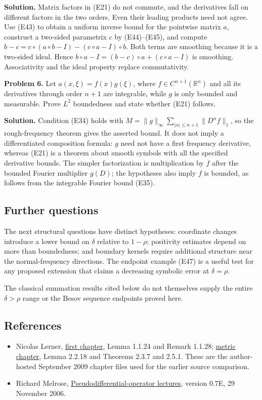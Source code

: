 \documentclass[
  11pt,
]{article}
\providecommand{\tightlist}{%
  \setlength{\itemsep}{0pt}\setlength{\parskip}{0pt}}
\begin{document}
\textbf{Solution.} Matrix factors in (E21) do not commute, and the
derivatives fall on different factors in the two orders. Even their
leading products need not agree. Use (E43) to obtain a uniform inverse
bound for the pointwise matrix \(a\), construct a two-sided parametrix
\(c\) by (E44)--(E45), and compute
\(b-c=c\circ(a\circ b-I)-(c\circ a-I)\circ b\). Both terms are smoothing
because it is a two-sided ideal. Hence
\(b\circ a-I=(b-c)\circ a+(c\circ a-I)\) is smoothing. Associativity and
the ideal property replace commutativity.

\textbf{Problem 6.} Let \(a(x,\xi)=f(x)g(\xi)\), where
\(f\in C^{n+1}(\mathbb R^n)\) and all its derivatives through order
\(n+1\) are integrable, while \(g\) is only bounded and measurable.
Prove \(L^2\) boundedness and state whether (E21) follows.

\textbf{Solution.} Condition (E34) holds with
\(M=\|g\|_\infty\sum_{|\alpha|\leq n+1}\|D^\alpha f\|_1\), so the
rough-frequency theorem gives the asserted bound. It does not imply a
differentiated composition formula: \(g\) need not have a first
frequency derivative, whereas (E21) is a theorem about smooth symbols
with all the specified derivative bounds. The simpler factorization is
multiplication by \(f\) after the bounded Fourier multiplier \(g(D)\);
the hypotheses also imply \(f\) is bounded, as follows from the
integrable Fourier bound (E35).

\subsection{Further questions}\label{further-questions}

The next structural questions have distinct hypotheses: coordinate
changes introduce a lower bound on \(\delta\) relative to \(1-\rho\);
positivity estimates depend on more than boundedness; and boundary
kernels require additional structure near the normal-frequency
directions. The endpoint example (E47) is a useful test for any proposed
extension that claims a decreasing symbolic error at \(\delta=\rho\).

The classical summation results cited below do not themselves supply the
entire \(\delta>\rho\) range or the Besov sequence endpoints proved
here.

\subsection{References}\label{references}

\begin{itemize}
\tightlist
\item
  Nicolas Lerner,
  \href{https://webusers.imj-prg.fr/~nicolas.lerner/ch1booklerner.pdf}{first
  chapter}, Lemma 1.1.24 and Remark 1.1.28;
  \href{https://webusers.imj-prg.fr/~nicolas.lerner/ch2booklerner.pdf}{metric
  chapter}, Lemma 2.2.18 and Theorems 2.3.7 and 2.5.1. These are the
  author-hosted September 2009 chapter files used for the earlier source
  comparison.
\item
  Richard Melrose,
  \href{https://math.mit.edu/~rbm/18.157-F05.pdf}{Pseudodifferential-operator
  lectures}, version 0.7E, 29 November 2006.
\end{itemize}
\end{document}

